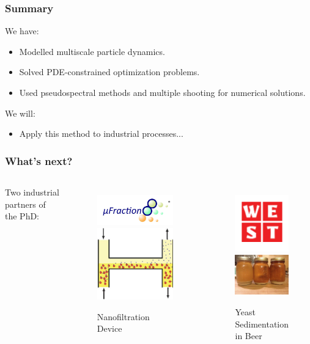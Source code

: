 \documentclass[aspectratio=169,xcolor=dvipsnames]{beamer}
\begin{document}
\begin{frame}
	\frametitle{Summary}
	We have:
 \begin{itemize}
 	\item Modelled multiscale particle dynamics.
 	\item Solved PDE-constrained optimization problems.
 	\item Used pseudospectral methods and multiple shooting for numerical solutions.
 \end{itemize}
We will:
\begin{itemize}
 	\item Apply this method to industrial processes...
 \end{itemize}
	
\end{frame}
\begin{frame}
	\frametitle{What's next?}
	
	\begin{columns}
		Two industrial partners of the PhD:
		\begin{figure}
			\includegraphics[width=4cm]{ufraction8.png}
			\includegraphics[width=4cm]{Microfilter.png}
			\caption{Nanofiltration Device}
		\end{figure}
		
		\begin{figure}
			\includegraphics[width=3.5cm]{west.png}\\
			\includegraphics[width=3.5cm]{beer.jpg}
			\caption{Yeast Sedimentation in Beer}
		\end{figure}
	\end{columns}
\end{frame}
\end{document}
